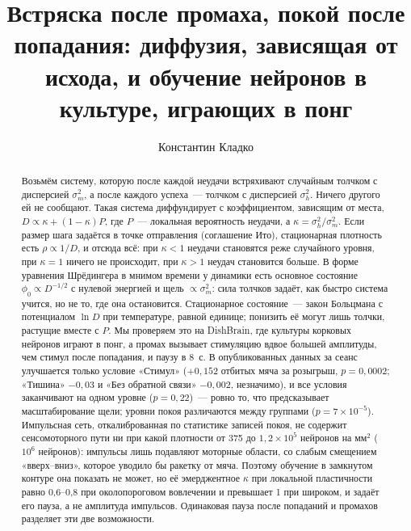 \documentclass[pre,twocolumn,superscriptaddress,showpacs=false,amsmath,amssymb,nofootinbib]{revtex4-2}
\begin{document}
\title{Встряска после промаха, покой после попадания: диффузия, зависящая от исхода, и обучение нейронов в культуре, играющих в понг}

\author{Константин Кладко}

\begin{abstract}
Возьмём систему, которую после каждой неудачи встряхивают случайным толчком с дисперсией $\sigma_m^2$, а после каждого успеха~--- толчком с дисперсией $\sigma_h^2$. Ничего другого ей не сообщают. Такая система диффундирует с коэффициентом, зависящим от места, $D\propto\kappa+(1-\kappa)P$, где $P$~--- локальная вероятность неудачи, а $\kappa=\sigma_h^2/\sigma_m^2$. Если размер шага задаётся в точке отправления (соглашение Ито), стационарная плотность есть $\rho\propto1/D$, и отсюда всё: при $\kappa<1$ неудачи становятся реже случайного уровня, при $\kappa=1$ ничего не происходит, при $\kappa>1$ неудач становится больше. В форме уравнения Шрёдингера в мнимом времени у динамики есть основное состояние $\phi_0\propto D^{-1/2}$ с нулевой энергией и щель $\propto\sigma_m^2$: сила толчков задаёт, как быстро система учится, но не то, где она остановится. Стационарное состояние~--- закон Больцмана с потенциалом $\ln D$ при температуре, равной единице; понизить её могут лишь толчки, растущие вместе с $P$. Мы проверяем это на DishBrain, где культуры корковых нейронов играют в понг, а промах вызывает стимуляцию вдвое большей амплитуды, чем стимул после попадания, и паузу в 8~с. В опубликованных данных за сеанс улучшается только условие «Стимул» ($+0{,}152$ отбитых мяча за розыгрыш, $p=0{,}0002$; «Тишина» $-0{,}03$ и «Без обратной связи» $-0{,}002$, незначимо), и все условия заканчивают на одном уровне ($p=0{,}22$)~--- ровно то, что предсказывает масштабирование щели; уровни покоя различаются между группами ($p=7\times10^{-5}$). Импульсная сеть, откалиброванная по статистике записей покоя, не содержит сенсомоторного пути ни при какой плотности от 375 до $1{,}2\times10^5$ нейронов на мм$^2$ ($10^6$ нейронов): импульсы лишь подавляют моторные области, со слабым смещением «вверх--вниз», которое уводило бы ракетку от мяча. Поэтому обучение в замкнутом контуре она показать не может, но её эмерджентное $\kappa$ при локальной пластичности равно 0{,}6--0{,}8 при околопороговом вовлечении и превышает 1 при широком, и задаёт его пауза, а не амплитуда импульсов. Одинаковая пауза после попаданий и промахов разделяет эти две возможности.
\end{abstract}
\end{document}
